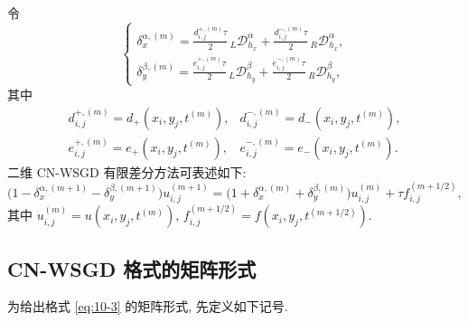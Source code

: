 令
\[
\left\{
\begin{array}{l}
\displaystyle \delta_{x}^{\alpha,(m)}=\frac{d_{i,j}^{+,(m)}\tau}{2}\,{}_{L}\mathcal{D}_{h_{x}}^{\alpha}+\frac{d_{i,j}^{-,(m)}\tau}{2}\,{}_{R}\mathcal{D}_{h_{x}}^{\alpha},\\[4mm]
\displaystyle \delta_{y}^{\beta,(m)}=\frac{e_{i,j}^{+,(m)}\tau}{2}\,{}_{L}\mathcal{D}_{h_{y}}^{\beta}+\frac{e_{i,j}^{-,(m)}\tau}{2}\,{}_{R}\mathcal{D}_{h_{y}}^{\beta},
\end{array}
\right.
\]
其中
\[
\begin{array}{ll}
d_{i,j}^{+,(m)}=d_{+}(x_{i},y_{j},t^{(m)}), & d_{i,j}^{-,(m)}=d_{-}(x_{i},y_{j},t^{(m)}),\\[1mm]
e_{i,j}^{+,(m)}=e_{+}(x_{i},y_{j},t^{(m)}), & e_{i,j}^{-,(m)}=e_{-}(x_{i},y_{j},t^{(m)}).
\end{array}
\]
二维 CN-WSGD 有限差分方法可表述如下:
\begin{equation}
  \bigl(1-\delta_{x}^{\alpha,(m+1)}-\delta_{y}^{\beta,(m+1)}\bigr)u_{i,j}^{(m+1)}
  =\bigl(1+\delta_{x}^{\alpha,(m)}+\delta_{y}^{\beta,(m)}\bigr)u_{i,j}^{(m)}
  +\tau f_{i,j}^{(m+1/2)},
\label{eq:10-3}
\end{equation}
其中 $u_{i,j}^{(m)}=u(x_{i},y_{j},t^{(m)})$, $f_{i,j}^{(m+1/2)}=f(x_{i},y_{j},t^{(m+1/2)})$.

\subsection{CN-WSGD 格式的矩阵形式}
\label{sec:10-2-2}

为给出格式 \eqref{eq:10-3} 的矩阵形式, 先定义如下记号.

